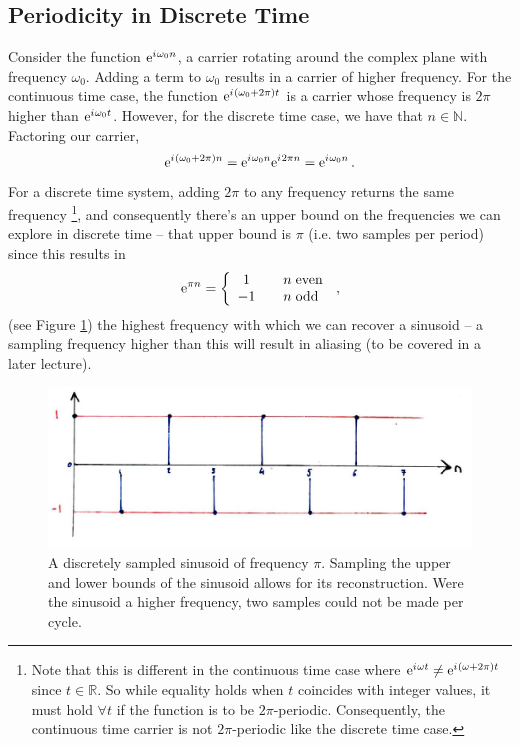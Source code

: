 \subsection{Periodicity in Discrete Time}
%
Consider the function $\mathrm{e}^{{i\mkern1mu}\omega_0 n}$, a carrier rotating around the
complex plane with frequency $\omega_0$. Adding a term to $\omega_0$ results in
a carrier of higher frequency. For the continuous time case, the function
$\mathrm{e}^{{i\mkern1mu}(\omega_0 + 2\pi)t}$ is a carrier whose frequency is $2\pi$ higher
than $\mathrm{e}^{{i\mkern1mu}\omega_0 t}$. However, for the discrete time case, we have that
$n\in\mathbb{N}$. Factoring our carrier,
%
\begin{displaymath}
  \mathrm{e}^{{i\mkern1mu}(\omega_0 + 2\pi)n} = \mathrm{e}^{{i\mkern1mu}\omega_0n}\mathrm{e}^{{i\mkern1mu} 2\pi n} = \mathrm{e}^{{i\mkern1mu}\omega_0n} \,.
\end{displaymath}
%
For a discrete time system, adding $2\pi$ to any frequency returns the same frequency
\footnote{
  Note that this is different in the continuous time case where
  $\mathrm{e}^{{i\mkern1mu}\omega t} \neq \mathrm{e}^{{i\mkern1mu}(\omega + 2\pi)t}$ since $t\in\mathbb{R}$. So while equality
  holds when $t$ coincides with integer values, it must hold $\forall t$ if the function is to
  be $2\pi$-periodic. Consequently, the continuous time carrier is not $2\pi$-periodic like
  the discrete time case.
}, and consequently there's an upper bound on the frequencies we can explore in discrete
time -- that upper bound is $\pi$ (i.e. two samples per period) since this results in
%
\begin{displaymath}
  \mathrm{e}^{\pi n} = \left\{\begin{array}{ccl}
  1 & & n\hspace{1mm}\mathrm{even} \\
  -1 & & n\hspace{1mm}\mathrm{odd} \\
  \end{array}\right. \,,
\end{displaymath}
%
(see Figure \ref{fig::lecture_1_discrete_sampling}) the highest frequency with which we can recover
a sinusoid -- a sampling frequency higher than this will result in aliasing (to be covered in a
later lecture). 
%
\begin{figure}[!htb]
  \includegraphics[width=\textwidth]{images/lecture_1_discrete_sampling.JPG}
  \caption{
    A discretely sampled sinusoid of frequency $\pi$. Sampling the upper and lower bounds of
    the sinusoid allows for its reconstruction. Were the sinusoid a higher frequency, two samples
    could not be made per cycle.
  }
  \label{fig::lecture_1_discrete_sampling}
\end{figure}
